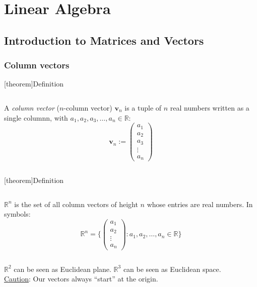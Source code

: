 \documentclass[12pt]{report}
\theoremstyle{definition}
\begin{document}


\chapter{Linear Algebra}

\section{Introduction to Matrices and Vectors}

\subsection{Column vectors}

[theorem]{Definition}
\begin{column vector}
    A \emph{column vector} ($n$-column vector) $\mathbf{v}_n$ is a tuple of $n$ real numbers written as a single columnn, 
    with $a_1, a_2, a_3, \ldots, a_n \in \mathbb{R}$:\[
    \mathbf{v}_n := 
    \begin{pmatrix}
        a_1 \\
        a_2 \\
        a_3 \\
        \vdots \\
        a_n
    \end{pmatrix}
    \]
\end{column vector}

[theorem]{Definition}
\begin{set of column vectors}
    $\mathbb{R}^{n}$ is the set of all column vectors of height $n$ whose entries are real numbers.
    In symbols:\[
        \mathbb{R}^{n} = \{
            \begin{pmatrix}
                    a_1\\
                    a_2\\
                    \vdots\\
                    a_n
            \end{pmatrix}
            : a_1, a_2, \ldots, a_n \in \mathbb{R}
        \} 
    \]
\end{set of column vectors}

\begin{ex}
    $\mathbb{R}^{2}$ can be seen as Euclidean plane. $\mathbb{R}^{3}$ can be seen as Euclidean space.
    \\\underline{Caution}: Our vectors always ``start'' at the origin.
\end{ex}
\end{document}
